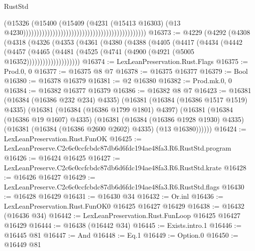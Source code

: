 \begin{lexlean}{RustStd}
\begin{coremodule}
                                                                                      (@15326
                                                                                        (@15400
                                                                                          (@15409
                                                                                            (@4231
                                                                                              (@15413
                                                                                                @16303)
                                                                                              (@13
                                                                                                @4230))))))))))))))))))))))))))))))))))))))))))))))
@16373 := @4229
    (@4292
      (@4308
        (@4318
          (@4326
            (@4353
              (@4361
                (@4380
                  (@4388
                    (@4405
                      (@4417
                        (@4434
                          (@4442
                            (@4457
                              (@4465
                                (@4481 (@4525 (@4741 (@4900 (@4921 (@5005 @16352))))))))))))))))))))
@16374 := LexLeanPreservation.Rust.Flags
@16375 := Prod.{0, 0}
@16377 := @16375 @8 @7
@16378 := @16375 @16377
@16379 := Bool
@16380 := @16378 @16379
@16381 := @2 @16380
@16382 := Prod.mk.{0, 0}
@16384 := @16382 @16377 @16379
@16386 := @16382 @8 @7
@16423 := @16381
    (@16384 (@16386 @232 @234) @4335)
    (@16381
      (@16384 (@16386 @1517 @1519) @4335)
      (@16381
        (@16384 (@16386 @1799 @1801) @4397)
        (@16381
          (@16384 (@16386 @19 @1607) @4335)
          (@16381
            (@16384 (@16386 @1928 @1930) @4335)
            (@16381 (@16384 (@16386 @2600 @2602) @4335) (@13 @16380))))))
@16424 := LexLeanPreservation.Rust.FunOK
@16425 := LexLeanPreserve.C2c6c0ccfcbdc87db6d6fdc194ae48fa3.R6.RustStd.program
@16426 := @16424 @16425
@16427 := LexLeanPreserve.C2c6c0ccfcbdc87db6d6fdc194ae48fa3.R6.RustStd.krate
@16428 := @16426 @16427
@16429 := LexLeanPreserve.C2c6c0ccfcbdc87db6d6fdc194ae48fa3.R6.RustStd.flags
@16430 := @16428 @16429
@16431 := @16430 @34
@16432 := Or.inl
@16436 := LexLeanPreservation.Rust.FunOK0 @16425 @16427 @16429
@16438 := @16432 (@16436 @34)
@16442 := LexLeanPreservation.Rust.FunLoop @16425 @16427 @16429
@16444 := @16438 (@16442 @34)
@16445 := Exists.intro.{1}
@16446 := @16445 @81
@16447 := And
@16448 := Eq.{1}
@16449 := Option.{0}
@16450 := @16449 @81

\end{coremodule}
\end{lexlean}
